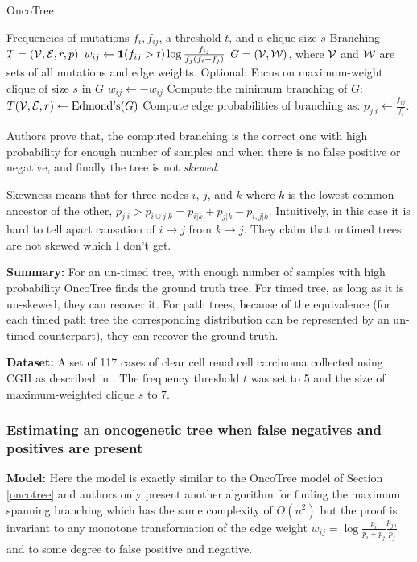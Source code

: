 	\begin{algorithm}[t]
		\caption{OncoTree}
		\label{alg1}
		\begin{algorithmic}[1]
			 Frequencies of mutations $f_i, f_{ij}$, a threshold $t$, and a clique size $s$
			 Branching $T = ({\cal V}, {\cal E}, r, p)$
			\STATE $w_{ij} \leftarrow {\large \bf 1}(f_{ij} > t) \log \frac{f_{ij}}{f_j(f_i + f_j)}$
			\STATE $G = ({\cal V}, {\cal W})$, where ${\cal V}$ and ${\cal W}$ are sets of all mutations and edge weights.
			\STATE Optional: Focus on maximum-weight clique of size $s$ in $G$
			\STATE $w_{ij} \leftarrow -w_{ij}$
			\STATE Compute the minimum branching of $G$: $T({\cal V}, {\cal E}, r) \leftarrow \text{Edmond's}(G)$
			\STATE Compute edge probabilities of branching as:  $p_{j|i} \leftarrow \frac{f_{ij}}{f_i}$.
		\end{algorithmic}
	\end{algorithm}
	
	
	Authors prove that, the computed branching is the correct one with high probability for enough number of samples and when there is no false positive or negative, and finally the tree is not \emph{skewed}. 
	
	Skewness means that for three nodes $i$, $j$, and $k$ where $k$ is the lowest common ancestor of the other, $p_{j|i} > p_{i\cup j|k} = p_{i|k} + p_{j|k} - p_{i, j|k}$. 
	Intuitively, in this case it is hard to tell apart causation of $i\rightarrow j$ from $k\rightarrow j$. 
	They claim that untimed trees are not skewed which I don't get. 
	
	{\bf Summary:}	
	For an un-timed tree, with enough number of samples with high probability OncoTree finds the ground truth tree. 
	For timed tree, as long as it is un-skewed, they can recover it. 
	For path trees, because of the equivalence (for each timed path tree the corresponding distribution can be represented by an un-timed counterpart), they can recover the ground truth. 
	
	{\bf Dataset:}
	A set of 117 cases of clear cell renal	cell carcinoma collected using CGH \cite{kallioniemi92} as described in \cite{moch96}. 
	The frequency threshold $t$ was set to 5 and the size of maximum-weighted clique $s$ to 7. 
	
	\subsubsection{Estimating an oncogenetic tree when false negatives and positives are present \cite{szabo02}}
	{\bf Model:}
	Here the model is exactly similar to the OncoTree model of Section \ref{oncotree} and authors only present another algorithm for finding the maximum spanning branching which has the same complexity of $O(n^2)$ but the proof is invariant to any monotone transformation of the edge weight $w_{ij} = \log \frac{p_i}{p_i + p_j} \frac{p_{j|i}}{p_j}$ and to some degree to false positive and negative.
	
